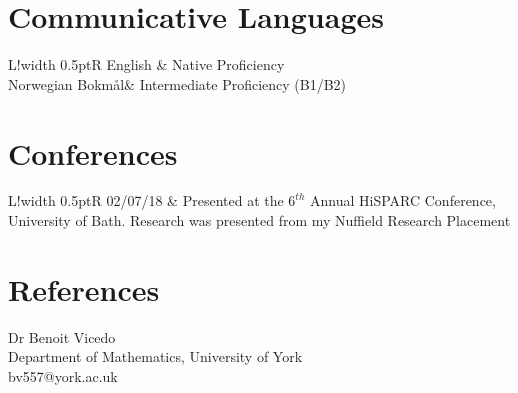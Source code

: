 \documentclass[10pt]{article}
\newcommand\VRule{\color{black}\vrule width 0.5pt}
\begin{document}
\section*{Communicative Languages}
\begin{tabular}{L!{\VRule}R}
English & {Native Proficiency}\\
Norwegian Bokm\aa l& Intermediate Proficiency (B1/B2) \\
\end{tabular}

\section*{Conferences}
\begin{tabular}{L!{\VRule}R}
02/07/18 & Presented at the $6^{th}$ Annual HiSPARC Conference, University of Bath. Research was presented from my Nuffield Research Placement
\end{tabular}

\section*{References}
\begin{minipage}[ht]{0.48\textwidth}
Dr Benoit Vicedo \\
Department of Mathematics, University of York \\
bv557@york.ac.uk
\end{minipage}
\end{document}
